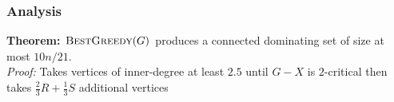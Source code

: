 \documentclass{beamer}
\begin{document}
\begin{frame}
\begin{center}
%
  \end{center}
\end{frame}

\begin{frame}
  \frametitle{Analysis}

  \textbf{Theorem:} $\textsc{BestGreedy}(G)$ produces a connected dominating set of size at most $10n/21$.\\[1em]

  \textit{Proof:} Takes vertices of inner-degree at least $2.5$ until $G-X$ is $2$-critical then takes $\tfrac{2}{3}R+\tfrac{1}{3}S$ additional vertices


\end{frame}
\end{document}
